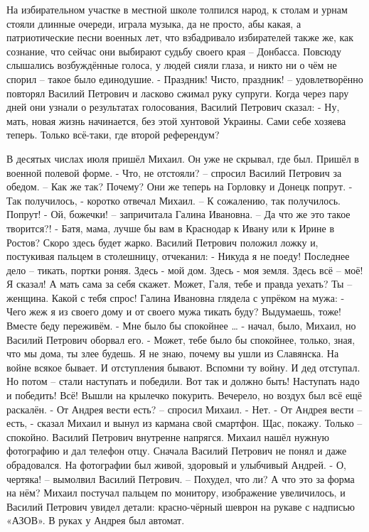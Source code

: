 На избирательном участке в местной школе толпился народ, к столам  и урнам стояли длинные очереди, играла музыка, да не просто, абы какая, а патриотические песни военных лет, что взбадривало избирателей также же, как сознание, что сейчас они выбирают судьбу своего края – Донбасса. Повсюду  слышались возбуждённые голоса, у людей сияли глаза, и никто ни о чём не спорил – такое было единодушие.
- Праздник! Чисто, праздник! – удовлетворённо повторял Василий Петрович и ласково сжимал руку супруги.
Когда через пару дней они узнали о результатах голосования, Василий Петрович сказал:
- Ну, мать, новая жизнь начинается, без этой хунтовой Украины. Сами себе хозяева теперь. Только всё-таки, где второй референдум?

В десятых числах июля пришёл Михаил. Он уже не скрывал, где был. Пришёл в военной полевой форме.
- Что, не отстояли? – спросил Василий Петрович за обедом. – Как же так? Почему? Они же теперь на Горловку и Донецк попрут.
- Так получилось, - коротко отвечал Михаил. – К сожалению, так получилось. Попрут!
- Ой, божечки! – запричитала Галина Ивановна. – Да что же это такое творится?!
- Батя, мама, лучше бы вам в Краснодар к Ивану или к Ирине в Ростов? Скоро здесь будет жарко.
Василий Петрович положил ложку и, постукивая пальцем в столешницу, отчеканил:
- Никуда я не поеду! Последнее дело – тикать, портки роняя. Здесь - мой дом. Здесь - моя земля. Здесь всё – моё! Я сказал! А мать сама за себя скажет. Может, Галя, тебе и правда уехать? Ты – женщина. Какой с тебя спрос!
Галина Ивановна глядела с упрёком на мужа:
- Чего жеж я из своего дому и от своего мужа тикать буду? Выдумаешь, тоже! Вместе беду переживём.
- Мне было бы спокойнее … - начал, было, Михаил, но Василий Петрович оборвал его.
- Может, тебе было бы спокойнее, только, зная, что мы дома, ты злее будешь. Я не знаю, почему вы ушли из Славянска. На войне всякое бывает. И отступления бывают. Вспомни ту войну. И дед отступал. Но потом – стали наступать и победили. Вот так и должно быть! Наступать надо и победить! Всё!
Вышли на крылечко покурить. Вечерело, но воздух был всё ещё раскалён.
- От Андрея вести есть? – спросил Михаил.
- Нет.
- От Андрея вести – есть, - сказал Михаил и вынул из кармана свой смартфон. Щас, покажу. Только – спокойно.
Василий Петрович внутренне напрягся. Михаил нашёл нужную фотографию и дал телефон отцу. Сначала Василий Петрович не понял и даже обрадовался. На фотографии был живой, здоровый и улыбчивый Андрей.
- О, чертяка! – вымолвил Василий Петрович. – Похудел, что ли? А что это за форма на нём?
Михаил постучал пальцем по монитору, изображение увеличилось, и Василий Петрович увидел детали: красно-чёрный шеврон на рукаве с надписью «АЗОВ». В руках у Андрея был автомат.
